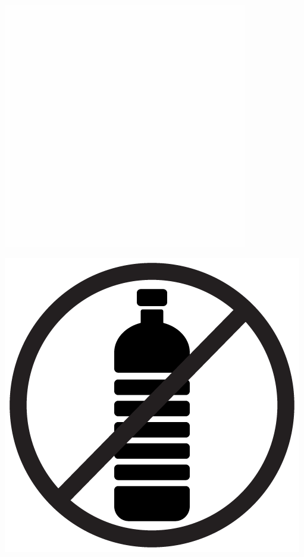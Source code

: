 \documentclass{article}
\begin{document}
\begin{multicols}{2}

\includegraphics[scale=0.2]{w}

\includegraphics[scale=0.45]{noplastic}


\end{multicols}
\end{document}
